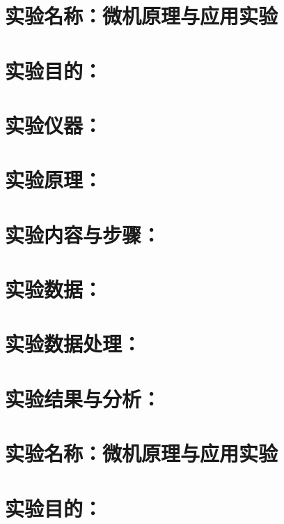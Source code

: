 \documentclass{USTBReport}
\begin{document}
\makecover
\maketitle

\section{实验名称：微机原理与应用实验}

\section{实验目的：}

\section{实验仪器：}

\section{实验原理：}

\section{实验内容与步骤：}

\section{实验数据：}

\section{实验数据处理：}

\section{实验结果与分析：}


\maketitle

\section{实验名称：微机原理与应用实验}

\section{实验目的：}
\end{document}
